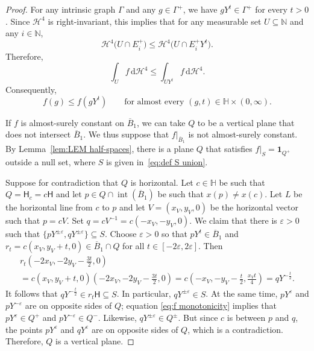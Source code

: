 \documentclass[11pt,reqno]{amsart}
\renewcommand{\H}{\mathbb{H}}
\newcommand{\N}{\mathbb{N}}
\newcommand{\cH}{\mathcal{H}}
\renewcommand{\epsilon}{\varepsilon}
\newcommand{\e}{\varepsilon}
\newcommand{\ud}[0]{\,\mathrm{d}}
\newcommand{\0}{\mathbf{0}}
\renewcommand{\1}{\mathbf 1}
\newcommand{\one}{\mathbf{1}}
\renewcommand{\subset}{\subseteq}
\renewcommand{\le}{\leqslant}
\theoremstyle{remark}
\DeclareMathOperator{\inter}{int}
\begin{document}
\begin{proof}
  For any intrinsic graph $\Gamma$ and any $g\in \Gamma^+$, we have $gY^t\in \Gamma^+$ for every $t>0$.  Since $\cH^4$ is right-invariant, this implies that for any measurable set $U\subset \N$ and any $i\in \N$,
  $$\cH^4\big(U\cap E_i^+\big)\le \cH^4\big(U\cap E_i^+ Y^t\big).$$
  Therefore,
  $$\int_U f \ud \cH^4\le \int_{U Y^t} f \ud \cH^4.$$
  Consequently,
  \begin{equation}\label{eq:f monotonicity}
    f(g)\le f(gY^t)\qquad\text{for almost every $(g,t)\in \H\times (0,\infty)$}.
  \end{equation}

  If $f$ is almost-surely constant on $\overline{B}_1$, we can take $Q$ to be a vertical plane that does not intersect $\overline{B}_1$.  We thus suppose that $f|_{\overline{B}_1}$ is not almost-surely constant.  By Lemma~\ref{lem:LEM half-spaces}, there is a plane $Q$ that satisfies $f|_{S}=\one_{Q^+}$ outside a null set, where $S$ is given in~\eqref{eq:def S union}.

  Suppose for contradiction that $Q$ is horizontal.  Let $c\in \H$ be such that $Q = \mathsf{H}_c = c \mathsf{H}$ and let $p\in Q\cap \inter (\overline{B}_1)$ be such that $x(p)\ne x(c)$.  Let $L$ be the horizontal line from $c$ to $p$ and let $V=(x_V,y_V,0)$ be the horizontal vector such that $p=cV$.  Set $q = c V^{-1}=c(-x_V,-y_V,0)$. We claim that there is $\epsilon>0$ such that $\{pY^{\pm\epsilon}, q Y^{\pm \epsilon}\}\subset S$.  Choose $\epsilon>0$ so that $p Y^t\in \overline{B}_1$ and $r_t=c (x_V, y_V+t,0)\in \overline{B}_1\cap Q$ for all $t\in [-2\e,2\e]$.  Then
  \begin{multline*}
    r_t  \left(-2x_V, - 2y_V -\frac{3t}{2}, 0\right)
    \\= c  (x_V,y_V+t,0)  \left(-2x_V, -2y_V -\frac{3t}{2}, 0\right)
    = c  \left(-x_V,-y_V-\frac{t}{2}, \frac{x_V t}{4}\right)
    = q Y^{-\frac{t}{2}}.
  \end{multline*}
  It follows that  $q Y^{-\frac{t}{2}}\in r_t \mathsf{H} \subset S$.  In particular, $q Y^{\pm\epsilon}\in S$. At the same time, $p Y^{\epsilon}$ and $p Y^{-\epsilon}$ are on opposite sides of $Q$; equation \eqref{eq:f monotonicity} implies that $p Y^{\epsilon}\in Q^+$ and $p Y^{-\epsilon}\in Q^-$.  Likewise, $q Y^{\pm \epsilon}\in Q^\pm$.  But since $c$ is between $p$ and $q$, the points $p Y^{\epsilon}$ and $q Y^{\epsilon}$ are on opposite sides of $Q$, which is a contradiction.  Therefore, $Q$ is a vertical plane.
\end{proof}
\end{document}
